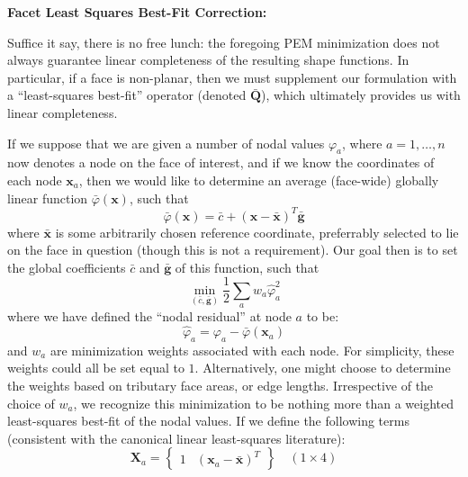 \documentclass[11pt]{article} %
\begin{document}
\begin{center}
\textbf{Facet Least Squares Best-Fit Correction:}
\end{center}

Suffice it say, there is no free lunch: the foregoing PEM minimization does not always guarantee linear completeness of the resulting shape functions. In particular, if a face is non-planar, then we must supplement our formulation with a ``least-squares best-fit'' operator (denoted $\bar{\mathbf{Q}}$), which ultimately provides us with linear completeness.

If we suppose that we are given a number of nodal values $\varphi_a$, where $a = 1, \ldots, n$ now denotes a node on the face of interest, and if we know the coordinates of each node $\mathbf{x}_a$, then we would like to determine an average (face-wide) globally linear function $\bar{\varphi} (\mathbf{x})$, such that
\begin{equation}
	\bar{\varphi} (\mathbf{x}) = \bar{c} + (\mathbf{x} - \bar{\mathbf{x}})^T \bar{\mathbf{g}}
\end{equation}
where $\bar{\mathbf{x}}$ is some arbitrarily chosen reference coordinate, preferrably selected to lie on the face in question (though this is not a requirement). Our goal then is to set the global coefficients $\bar{c}$ and $\bar{\mathbf{g}}$ of this function, such that
\begin{equation}
	\min_{(\bar{c}, \bar{\mathbf{g}})} \frac{1}{2} \sum_a w_a \hat{\varphi}_a^2
\end{equation}
where we have defined the ``nodal residual'' at node $a$ to be:
\begin{equation}
	\hat{\varphi}_a = \varphi_a - \bar{\varphi} (\mathbf{x}_a)
\end{equation}
and $w_a$ are minimization weights associated with each node. For simplicity, these weights could all be set equal to $1$. Alternatively, one might choose to determine the weights based on tributary face areas, or edge lengths. Irrespective of the choice of $w_a$, we recognize this minimization to be nothing more than a weighted least-squares best-fit of the nodal values. If we define the following terms (consistent with the canonical linear least-squares literature):
\begin{equation}
	\mathbf{X}_a = \left\{ \begin{array}{cc} 1 & (\mathbf{x}_a - \bar{\mathbf{x}})^T \end{array} \right\} \quad (1\times4)
\end{equation}
\end{document}
